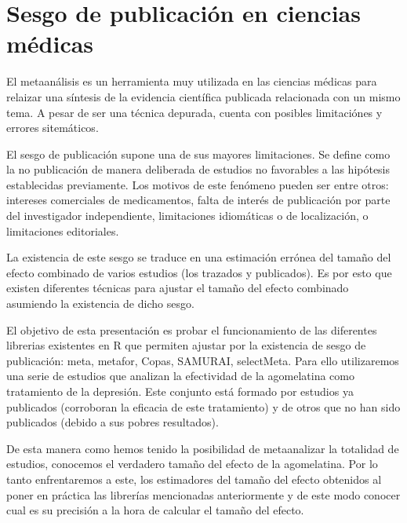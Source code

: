 \chapter{Sesgo de publicación en ciencias médicas}




El metaanálisis es un herramienta muy utilizada en las ciencias médicas para relaizar una síntesis de la evidencia científica publicada relacionada con un mismo tema. A pesar de ser una técnica depurada, cuenta con posibles limitaciónes y errores sitemáticos. 

El sesgo de publicación supone una de sus mayores limitaciones. Se define como la no publicación de manera deliberada de estudios no favorables a las hipótesis establecidas previamente. Los motivos de este fenómeno pueden ser entre otros: intereses comerciales de medicamentos, falta de interés de publicación por parte del investigador independiente, limitaciones idiomáticas o de localización, o limitaciones editoriales.

La existencia de este sesgo se traduce en una estimación errónea del tamaño del efecto combinado de varios estudios (los trazados y publicados). Es por esto que existen diferentes técnicas para ajustar el tamaño del efecto combinado asumiendo la existencia de dicho sesgo. 

El objetivo de esta presentación es probar el funcionamiento de las diferentes librerias existentes en R que permiten ajustar por la existencia de sesgo de publicación: meta, metafor, Copas, SAMURAI, selectMeta. Para ello utilizaremos una serie de estudios que analizan la efectividad de la agomelatina como tratamiento de la depresión. Este conjunto está formado por estudios ya publicados (corroboran la eficacia de este tratamiento) y de otros que no han sido publicados (debido a sus pobres resultados).

De esta manera como hemos tenido la posibilidad de metaanalizar la totalidad de estudios, conocemos el verdadero tamaño del efecto de la agomelatina. Por lo tanto enfrentaremos a este, los estimadores del tamaño del efecto obtenidos al poner en práctica las librerías mencionadas anteriormente y de este modo conocer cual es su precisión a la hora de calcular el tamaño del efecto.




%

%
